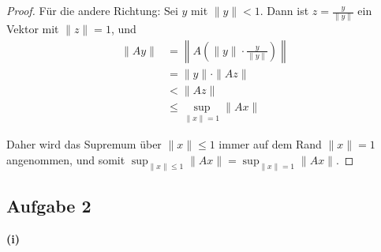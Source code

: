 \documentclass{article}
\begin{document}
\begin{proof}
    Für die andere Richtung: Sei $y$ mit $\|y\| < 1$. Dann ist $z = \frac{y}{\|y\|}$ ein Vektor mit $\|z\|=1$, und 
    \begin{align*}
    \|Ay\| &= \left\|A\left(\|y\| \cdot \frac{y}{\|y\|}\right)\right\| \\
    &= \|y\| \cdot \|Az\| \\
    &< \|Az\| \\
    &\leq \sup_{\|x\|=1} \|Ax\|
    \end{align*}
    
    Daher wird das Supremum über $\|x\|\leq1$ immer auf dem Rand $\|x\|=1$ angenommen, und somit $\sup_{\|x\|\leq1} \|Ax\| = \sup_{\|x\|=1} \|Ax\|$.
\end{proof}

\clearpage

\subsection*{Aufgabe 2}

\textbf{(i)}
\end{document}
